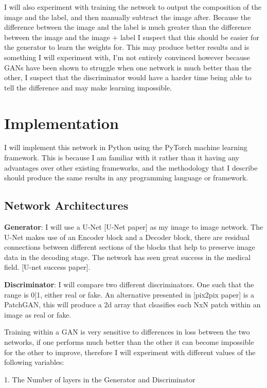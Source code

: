 \documentclass{UoYCSproject}
\begin{document}
I will also experiment with training the network to output the composition of the image and the label, and then manually subtract the image after. Because the difference between the image and the label is much greater than the difference between the image and the image + label I suspect that this should be easier for the generator to learn the weights for. This may produce better results and is something I will experiment with, I'm not entirely convinced however because GANs have been shown to struggle when one network is much better than the other, I suspect that the discriminator would have a harder time being able to tell the difference and may make learning impossible. 

\section{Implementation}

I will implement this network in Python using the PyTorch machine learning framework. This is because I am familiar with it rather than it having any advantages over other existing frameworks, and the methodology that I describe should produce the same results in any programming language or framework.

\subsection{Network Architectures}

\textbf{Generator}: I will use a U-Net [U-Net paper] as my image to image network. The U-Net makes use of an Encoder block and a Decoder block, there are residual connections between different sections of the blocks that help to preserve image data in the decoding stage. The network has seen great success in the medical field. [U-net success paper].

\textbf{Discriminator}: I will compare two different discriminators. One such that the range is {0|1}, either real or fake. An alternative presented in [pix2pix paper] is a PatchGAN, this will produce a 2d array that clsasifies each NxN patch within an image as real or fake.

Training within a GAN is very sensitive to differences in loss between the two networks, if one performs much better than the other it can become impossible for the other to improve, therefore I will experiment with different values of the following variables:

1. The Number of layers in the Generator and Discriminator
\end{document}
